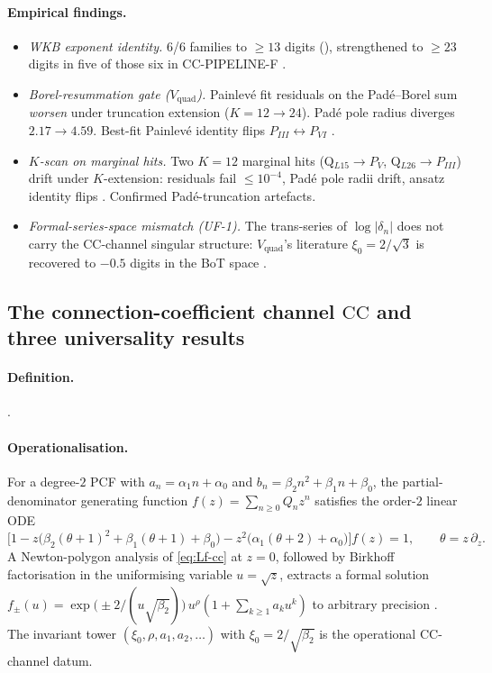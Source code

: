 \documentclass[11pt,reqno]{amsart}
\theoremstyle{plain}
\theoremstyle{definition}
\theoremstyle{remark}
\newcommand{\CC}{\mathrm{CC}}
\newcommand{\Vquad}{V_{\mathrm{quad}}}
\newcommand{\dn}{\delta_{n}}
\begin{document}
\paragraph{Empirical findings.}
\begin{itemize}
\item \emph{WKB exponent identity.} 6/6 families to
$\ge 13$ digits (), strengthened to
$\ge 23$ digits in five of those six in
CC-PIPELINE-F \cite{siarc_cc_pipeline_f}.
\item \emph{Borel-resummation gate ($\Vquad$).} Painlev\'e
fit residuals on the Pad\'e--Borel sum
\emph{worsen} under truncation extension
($K = 12 \to 24$). Pad\'e pole radius diverges
$2.17 \to 4.59$. Best-fit Painlev\'e identity flips
$P_{III} \leftrightarrow P_{VI}$ \cite{siarc_borel_5x}.
\item \emph{$K$-scan on marginal hits.} Two $K=12$ marginal
hits (Q$_{L15} \to P_V$, Q$_{L26} \to P_{III}$) drift under
$K$-extension: residuals fail $\le 10^{-4}$, Pad\'e pole
radii drift, ansatz identity flips
\cite{siarc_borel_kscan}. Confirmed Pad\'e-truncation
artefacts.
\item \emph{Formal-series-space mismatch (UF-1).} The trans-series
of $\log|\dn|$ does not carry the $\CC$-channel singular structure:
$\Vquad$'s literature $\xi_0 = 2/\sqrt 3$ is recovered to $-0.5$
digits in the BoT space \cite{siarc_cc_pipeline_f}.
\end{itemize}

\subsection{The connection-coefficient channel $\CC$
and three universality results}
\label{ssec:cc}

\paragraph{Definition.} .

\paragraph{Operationalisation.}
For a degree-$2$ PCF with $a_n = \alpha_1 n + \alpha_0$ and
$b_n = \beta_2 n^2 + \beta_1 n + \beta_0$, the partial-denominator
generating function $f(z) = \sum_{n \ge 0} Q_n z^n$ satisfies
the order-$2$ linear ODE
\begin{equation}
\bigl[1
  - z\bigl(\beta_2(\theta+1)^2+\beta_1(\theta+1)+\beta_0\bigr)
  - z^2\bigl(\alpha_1(\theta+2)+\alpha_0\bigr)\bigr] f(z) = 1,
\qquad \theta = z\,\partial_z. \label{eq:Lf-cc}
\end{equation}
A Newton-polygon analysis of \eqref{eq:Lf-cc} at $z=0$,
followed by Birkhoff factorisation in the uniformising
variable $u = \sqrt z$, extracts a formal solution
$f_\pm(u) = \exp\bigl(\pm 2/(u\sqrt{\beta_2})\bigr)\,
u^{\rho}(1 + \sum_{k \ge 1} a_k u^k)$ to arbitrary precision
\cite{siarc_cc_pipeline_g}. The invariant tower
$(\xi_0, \rho, a_1, a_2, \ldots)$ with
$\xi_0 = 2/\sqrt{\beta_2}$ is the operational $\CC$-channel
datum.
\end{document}
